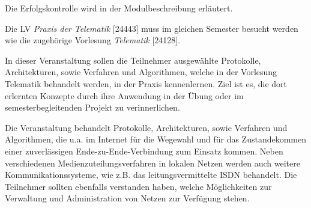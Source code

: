 \begin{course}

\setdoclanguagegerman
{}



\coursehead


\label{cour_8163.dp_997}


\begin{styleenv}
\begin{assessment}
Die Erfolgskontrolle wird in der Modulbeschreibung erläutert.


\end{assessment}

\begin{conditions}Die LV \emph{Praxis der Telematik} [24443] muss im gleichen Semester besucht werden wie die zugehörige Vorlesung \emph{Telematik} [24128].

\end{conditions}


\end{styleenv}

\begin{learningoutcomes}
In dieser Veranstaltung sollen die Teilnehmer ausgewählte Protokolle, Architekturen, sowie Verfahren und Algorithmen, welche in der Vorlesung Telematik behandelt werden, in der Praxis kennenlernen. Ziel ist es, die dort erlernten Konzepte durch ihre Anwendung in der Übung oder im semesterbegleitenden Projekt zu verinnerlichen.


\end{learningoutcomes}

\begin{content}
Die Veranstaltung behandelt Protokolle, Architekturen, sowie Verfahren und Algorithmen, die u.a. im Internet für die Wegewahl und für das Zustandekommen einer zuverlässigen Ende-zu-Ende-Verbindung zum Einsatz kommen. Neben verschiedenen Medienzuteilungsverfahren in lokalen Netzen werden auch weitere Kommunikationssysteme, wie z.B. das leitungsvermittelte ISDN behandelt. Die Teilnehmer sollten ebenfalls verstanden haben, welche Möglichkeiten zur Verwaltung und Administration von Netzen zur Verfügung stehen.



\end{content}
\end{course}
